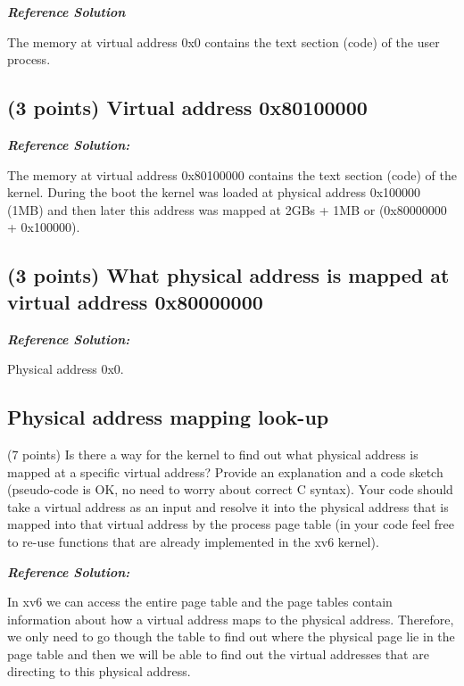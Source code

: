 \documentclass[]{article}
\begin{document}
\textbf{\emph{Reference Solution}}

The memory at virtual address 0x0 contains the text section (code) of
the user process.

\hypertarget{points-virtual-address-0x80100000}{%
\subsection{(3 points) Virtual address
0x80100000}\label{points-virtual-address-0x80100000}}

\textbf{\emph{Reference Solution:}}

The memory at virtual address 0x80100000 contains the text section
(code) of the kernel. During the boot the kernel was loaded at physical
address 0x100000 (1MB) and then later this address was mapped at 2GBs +
1MB or (0x80000000 + 0x100000).

\hypertarget{points-what-physical-address-is-mapped-at-virtual-address-0x80000000}{%
\subsection{(3 points) What physical address is mapped at virtual
address
0x80000000}\label{points-what-physical-address-is-mapped-at-virtual-address-0x80000000}}

\textbf{\emph{Reference Solution:}}

Physical address 0x0.

\hypertarget{physical-address-mapping-look-up}{%
\subsection{Physical address mapping
look-up}\label{physical-address-mapping-look-up}}

(7 points) Is there a way for the kernel to find out what physical
address is mapped at a specific virtual address? Provide an explanation
and a code sketch (pseudo-code is OK, no need to worry about correct C
syntax). Your code should take a virtual address as an input and resolve
it into the physical address that is mapped into that virtual address by
the process page table (in your code feel free to re-use functions that
are already implemented in the xv6 kernel).

\textbf{\emph{Reference Solution:}}

In xv6 we can access the entire page table and the page tables contain
information about how a virtual address maps to the physical address.
Therefore, we only need to go though the table to find out where the
physical page lie in the page table and then we will be able to find out
the virtual addresses that are directing to this physical address.
\end{document}
